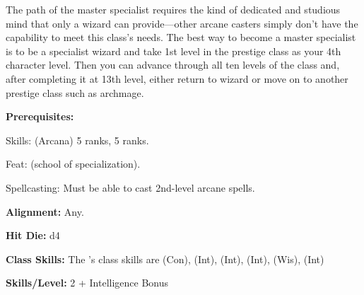 
The path of the master specialist requires the kind of dedicated and studious mind that only a wizard can provide—other arcane casters simply don't have the capability to meet this class's needs. The best way to become a master specialist is to be a specialist wizard and take 1st level in the prestige class as your 4th character level. Then you can advance through all ten levels of the class and, after completing it at 13th level, either return to wizard or move on to another prestige class such as archmage.

\textbf{Prerequisites:} 
\begin{description*}
\item[\hspace*{1.5cm}Skills:]  (Arcana) 5 ranks,  5 ranks.
\item[\hspace*{1.5cm}Feat:]  (school of specialization).
\item[\hspace*{1.5cm}Spellcasting:] Must be able to cast 2nd-level arcane spells.
\end{description*}

\textbf{Alignment:} Any.

\textbf{Hit Die:} d4

\textbf{Class Skills:} The \currentclassname{}'s class skills are  (Con),  (Int),  (Int),  (Int),  (Wis),  (Int)

\textbf{Skills/Level:} 2 + Intelligence Bonus

\poorbab{}
\poorfor{}
\poorref{}
\goodwil{}

